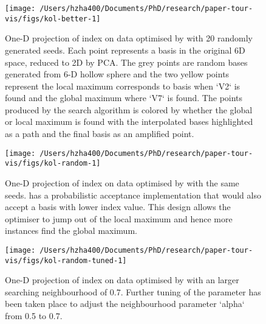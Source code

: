 \begin{Schunk}
\begin{figure}

{\centering \texttt{[image: /Users/hzha400/Documents/PhD/research/paper-tour-vis/figs/kol-better-1]} 

}

\caption[One-D projection of  index on  data optimised by  with 20 randomly generated seeds]{One-D projection of  index on  data optimised by  with 20 randomly generated seeds. Each point represents a basis in the original 6D space, reduced to 2D by PCA. The grey points are random bases generated from 6-D hollow sphere and the two yellow points represent the local maximum corresponds to basis when `V2` is found and the global maximum where `V7` is found. The points produced by the search algorithm is colored by whether the global or local maximum is found with the interpolated bases highlighted as a path and the final basis as an amplified point.}\label{fig:kol-better}
\end{figure}
\end{Schunk}

\begin{Schunk}
\begin{figure}

{\centering \texttt{[image: /Users/hzha400/Documents/PhD/research/paper-tour-vis/figs/kol-random-1]} 

}

\caption{One-D projection of  index on  data optimised by  with the same seeds.  has a probabilistic acceptance implementation that would also accept a basis with lower index value. This design allows the optimiser to jump out of the local maximum and hence more instances find the global maximum.}\label{fig:kol-random}
\end{figure}
\end{Schunk}

\begin{Schunk}
\begin{figure}

{\centering \texttt{[image: /Users/hzha400/Documents/PhD/research/paper-tour-vis/figs/kol-random-tuned-1]} 

}

\caption[One-D projection of  index on  data optimised by  with an larger searching neighbourhood of 0.7]{One-D projection of  index on  data optimised by  with an larger searching neighbourhood of 0.7. Further tuning of the parameter has been taken place to adjust the neighbourhood parameter `alpha` from 0.5 to 0.7. }\label{fig:kol-random-tuned}
\end{figure}
\end{Schunk}

